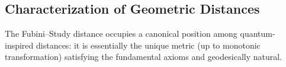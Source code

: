 \documentclass[aps,pra,reprint,nofootinbib,showpacs,superscriptaddress]{revtex4-1}
\newtheorem{theorem}{Theorem}[section]
\newcommand{\Hilbert}{\mathcal{H}}
\newcommand{\Proj}{\mathcal{P}}
\begin{document}
\subsection{Characterization of Geometric Distances}\label{subsec:char}

The Fubini–Study distance occupies a canonical position among quantum-inspired distances: it is essentially the unique metric (up to monotonic transformation) satisfying the fundamental axioms and geodesically natural.


\end{document}

